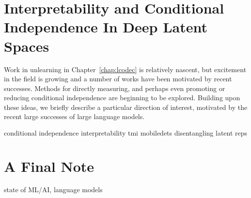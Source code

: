 \section{Interpretability and Conditional Independence In Deep Latent Spaces}\label{sec:latents}
Work in unlearning in Chapter~\ref{chap:lcodec} is relatively nascent,
but excitement in the field is growing
and a number of works have been motivated
by recent successes.
Methods for directly measuring, and perhaps
even promoting or reducing conditional
independence are beginning to be explored.
Building upon these ideas,
we briefly describe a particular 
direction of interest, motivated
by the recent large successes of large language models.



conditional independence
interpretability
tmi
mobiledets
disentangling latent reps


\section{A Final Note}
state of ML/AI, language models